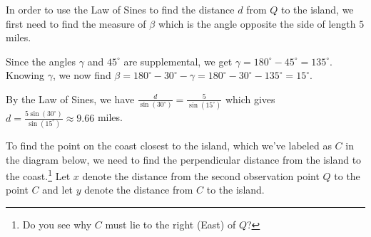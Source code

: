 \documentclass{ximera}
\begin{document}
\begin{example}
\begin{explanation}
\begin{image}
\end{image}

In order to use the Law of Sines to find the distance $d$ from $Q$ to the island, we first need to find the measure of $\beta$ which is the angle opposite the side of length $5$ miles.    

 

Since the angles $\gamma$ and $45^{\circ}$ are supplemental,  we get $\gamma = 180^{\circ} - 45^{\circ} = 135^{\circ}$. Knowing $\gamma$, we now find  $\beta = 180^{\circ} - 30^{\circ} - \gamma =  180^{\circ} - 30^{\circ} - 135^{\circ} = 15^{\circ}$. 

 

By the Law of Sines, we have $\frac{d}{\sin\left(30^{\circ}\right)} = \frac{5}{\sin\left(15^{\circ}\right)}$ which gives $d = \frac{5\sin\left(30^{\circ}\right)}{\sin\left(15^{\circ}\right)} \approx 9.66$ miles.  

 

To  find the point on the coast closest to the island, which we've labeled as $C$ in the diagram below, we need to find the perpendicular distance from the island to the coast.\footnote{Do you see why $C$ must lie to the right (East) of $Q$?} Let $x$ denote the distance from the second observation point $Q$ to the point $C$  and let $y$ denote the distance from $C$ to the island. 

\begin{image}
\end{image}
\end{explanation}
\end{example}
\end{document}
